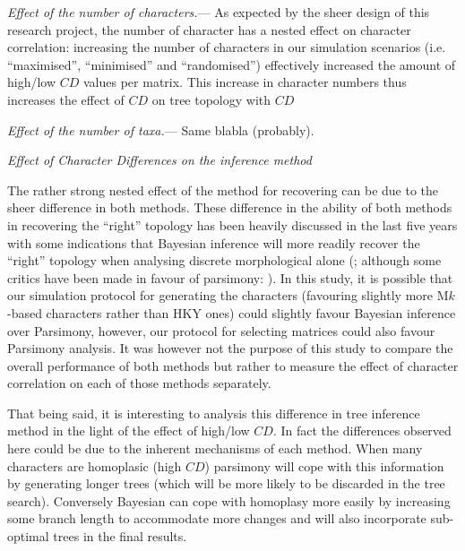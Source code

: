 \documentclass[12pt,letterpaper]{article}
\renewcommand{\subsection}[1]{%
\bigskip
\begin{center}
\begin{large}
\normalfont\itshape #1
\end{large}
\end{center}}
\renewcommand{\subsubsection}[1]{%
\vspace{2ex}
\noindent
\textit{#1.}---}
\begin{document}
\subsubsection{Effect of the number of characters}
As expected by the sheer design of this research project, the number of character has a nested effect on character correlation: increasing the number of characters in our simulation scenarios (i.e. ``maximised'', ``minimised'' and ``randomised'') effectively increased the amount of high/low $CD$ values per matrix.
This increase in character numbers thus increases the effect of $CD$ on tree topology with $CD$

\subsubsection{Effect of the number of taxa}
Same blabla (probably).

\subsection{Effect of Character Differences on the inference method}
The rather strong nested effect of the method for recovering can be due to the sheer difference in both methods.
These difference in the ability of both methods in recovering the ``right'' topology has been heavily discussed in the last five years with some indications that Bayesian inference will more readily recover the ``right'' topology when analysing discrete morphological alone (\citealt{wrightbayesian2014,OReilly20160081,puttick2017uncertain}; although some critics have been made in favour of parsimony: \citealt{spencerefficacy2013,goloboff2017weighted}).
In this study, it is possible that our simulation protocol for generating the characters (favouring slightly more M$k$-based characters rather than HKY ones) could slightly favour Bayesian inference over Parsimony, however, our protocol for selecting matrices \citep[i.e. those with in a $CI>0.26$ in a quick parsimony search;]{OReilly20160081} could also favour Parsimony analysis.
It was however not the purpose of this study to compare the overall performance of both methods but rather to measure the effect of character correlation on each of those methods separately.

That being said, it is interesting to analysis this difference in tree inference method in the light of the effect of high/low $CD$.
In fact the differences observed here could be due to the inherent mechanisms of each method.
When many characters are homoplasic (high $CD$) parsimony will cope with this information by generating longer trees (which will be more likely to be discarded in the tree search).
Conversely Bayesian can cope with homoplasy more easily by increasing some branch length to accommodate more changes and will also incorporate sub-optimal trees in the final results.
\end{document}
